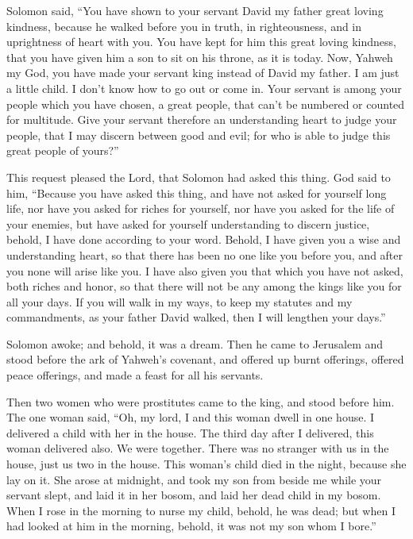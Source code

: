  Solomon said, ``You have shown to your servant David my
father great loving kindness, because he walked before you in truth, in
righteousness, and in uprightness of heart with you. You have kept for
him this great loving kindness, that you have given him a son to sit on
his throne, as it is today.  Now, Yahweh my God, you have
made your servant king instead of David my father. I am just a little
child. I don't know how to go out or come in.  Your servant
is among your people which you have chosen, a great people, that can't
be numbered or counted for multitude.  Give your servant
therefore an understanding heart to judge your people, that I may
discern between good and evil; for who is able to judge this great
people of yours?''

 This request pleased the Lord, that Solomon had asked this
thing.  God said to him, ``Because you have asked this
thing, and have not asked for yourself long life, nor have you asked for
riches for yourself, nor have you asked for the life of your enemies,
but have asked for yourself understanding to discern justice,
 behold, I have done according to your word. Behold, I have
given you a wise and understanding heart, so that there has been no one
like you before you, and after you none will arise like you.
 I have also given you that which you have not asked, both
riches and honor, so that there will not be any among the kings like you
for all your days.  If you will walk in my ways, to keep my
statutes and my commandments, as your father David walked, then I will
lengthen your days.''

 Solomon awoke; and behold, it was a dream. Then he came to
Jerusalem and stood before the ark of Yahweh's covenant, and offered up
burnt offerings, offered peace offerings, and made a feast for all his
servants.

 Then two women who were prostitutes came to the king, and
stood before him.  The one woman said, ``Oh, my lord, I and
this woman dwell in one house. I delivered a child with her in the
house.  The third day after I delivered, this woman
delivered also. We were together. There was no stranger with us in the
house, just us two in the house.  This woman's child died
in the night, because she lay on it.  She arose at
midnight, and took my son from beside me while your servant slept, and
laid it in her bosom, and laid her dead child in my bosom. 
When I rose in the morning to nurse my child, behold, he was dead; but
when I had looked at him in the morning, behold, it was not my son whom
I bore.''

